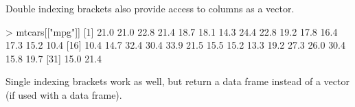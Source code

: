 \documentclass[
]{book}
\newenvironment{Shaded}{\begin{snugshade}}{\end{snugshade}}
\newcommand{\DecValTok}[1]{\textcolor[rgb]{0.00,0.00,0.81}{#1}}
\newcommand{\FloatTok}[1]{\textcolor[rgb]{0.00,0.00,0.81}{#1}}
\newcommand{\NormalTok}[1]{#1}
\newcommand{\SpecialCharTok}[1]{\textcolor[rgb]{0.00,0.00,0.00}{#1}}
\newcommand{\StringTok}[1]{\textcolor[rgb]{0.31,0.60,0.02}{#1}}
\begin{document}
\begin{Shaded}
\end{Shaded}

Double indexing brackets also provide access to columns as a vector.

\begin{Shaded}
\begin{Highlighting}[]
\SpecialCharTok{\textgreater{}}\NormalTok{ mtcars[[}\StringTok{"mpg"}\NormalTok{]]}
\NormalTok{ [}\DecValTok{1}\NormalTok{] }\FloatTok{21.0} \FloatTok{21.0} \FloatTok{22.8} \FloatTok{21.4} \FloatTok{18.7} \FloatTok{18.1} \FloatTok{14.3} \FloatTok{24.4} \FloatTok{22.8} \FloatTok{19.2} \FloatTok{17.8} \FloatTok{16.4} \FloatTok{17.3} \FloatTok{15.2} \FloatTok{10.4}
\NormalTok{[}\DecValTok{16}\NormalTok{] }\FloatTok{10.4} \FloatTok{14.7} \FloatTok{32.4} \FloatTok{30.4} \FloatTok{33.9} \FloatTok{21.5} \FloatTok{15.5} \FloatTok{15.2} \FloatTok{13.3} \FloatTok{19.2} \FloatTok{27.3} \FloatTok{26.0} \FloatTok{30.4} \FloatTok{15.8} \FloatTok{19.7}
\NormalTok{[}\DecValTok{31}\NormalTok{] }\FloatTok{15.0} \FloatTok{21.4}
\end{Highlighting}
\end{Shaded}

Single indexing brackets work as well, but return a data frame instead of a vector (if used with a data frame).
\end{document}
